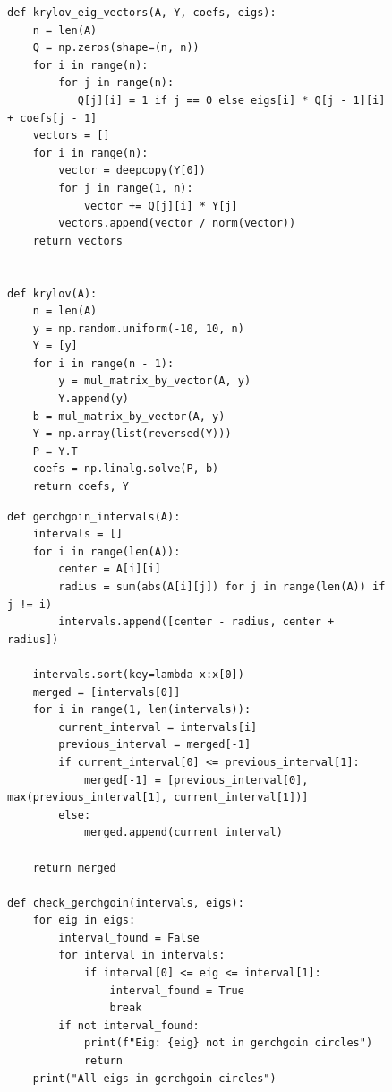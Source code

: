 \documentclass[a4paper, 14pt]{extarticle}
\begin{document}
\begin{figure}[H]
\begin{lstlisting}[language={},caption={Вычисление коофициентов характеристического уравнения и собственных векторов методом А.Н. Крылова},label={lst:code2}]
def krylov_eig_vectors(A, Y, coefs, eigs):
    n = len(A)
    Q = np.zeros(shape=(n, n))
    for i in range(n):
        for j in range(n):
           Q[j][i] = 1 if j == 0 else eigs[i] * Q[j - 1][i] + coefs[j - 1]
    vectors = []
    for i in range(n):
        vector = deepcopy(Y[0])
        for j in range(1, n):
            vector += Q[j][i] * Y[j]
        vectors.append(vector / norm(vector))
    return vectors


def krylov(A):
    n = len(A)
    y = np.random.uniform(-10, 10, n)
    Y = [y]
    for i in range(n - 1):
        y = mul_matrix_by_vector(A, y)
        Y.append(y)
    b = mul_matrix_by_vector(A, y)
    Y = np.array(list(reversed(Y)))
    P = Y.T
    coefs = np.linalg.solve(P, b)
    return coefs, Y
\end{lstlisting}
\end{figure}

\begin{figure}[H]
\begin{lstlisting}[language={},caption={Вычисление и объединение кругов Гершгорина},label={lst:code3}]
def gerchgoin_intervals(A):
    intervals = []
    for i in range(len(A)):
        center = A[i][i]
        radius = sum(abs(A[i][j]) for j in range(len(A)) if j != i)
        intervals.append([center - radius, center + radius])

    intervals.sort(key=lambda x:x[0])
    merged = [intervals[0]]
    for i in range(1, len(intervals)):
        current_interval = intervals[i]
        previous_interval = merged[-1]
        if current_interval[0] <= previous_interval[1]:
            merged[-1] = [previous_interval[0], max(previous_interval[1], current_interval[1])]
        else:
            merged.append(current_interval)

    return merged

def check_gerchgoin(intervals, eigs):
    for eig in eigs:
        interval_found = False
        for interval in intervals:
            if interval[0] <= eig <= interval[1]:
                interval_found = True
                break
        if not interval_found:
            print(f"Eig: {eig} not in gerchgoin circles")
            return
    print("All eigs in gerchgoin circles")
\end{lstlisting}
\end{figure}
\end{document}
